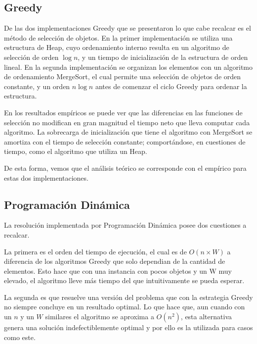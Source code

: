 \documentclass[a4paper,10pt,spanish]{article}
\begin{document}
	\subsection{Greedy}
	
	De las dos implementaciones Greedy que se presentaron lo que cabe recalcar es el m\'etodo de selecci\'on de objetos. En la primer implementaci\'on se utiliza una estructura de Heap, cuyo ordenamiento interno resulta en un algoritmo de selecci\'on de orden $\log n$, y un tiempo de inicializaci\'on de la estructura de orden lineal. En la segunda implementaci\'on se organizan los elementos con un algoritmo de ordenamiento MergeSort, el cual permite una selecci\'on de objetos de orden constante, y un orden $n\log n$ antes de comenzar el ciclo Greedy para ordenar la estructura.
	
	En los resultados emp\'iricos se puede ver que las diferencias en las funciones de selecci\'on no modifican en gran magnitud el tiempo neto que lleva computar cada algoritmo. La sobrecarga de inicializaci\'on que tiene el algoritmo con MergeSort se amortiza con el tiempo de selecci\'on constante; comport\'andose, en cuestiones de tiempo, como el algoritmo que utiliza un Heap.
	
	De esta forma, vemos que el an\'alisis te\'orico se corresponde con el emp\'irico para estas dos implementaciones. 
	
	\subsection{Programaci\'on Din\'amica}
	
	La resoluci\'on implementada por Programaci\'on Din\'amica posee dos cuestiones a recalcar.
	
	La primera es el orden del tiempo de ejecuci\'on, el cual es de $O(n\times W)$ a diferencia de los algoritmos Greedy que solo dependian de la cantidad de elementos. Esto hace que con una instancia con pocos objetos y un W muy elevado, el algoritmo lleve m\'as tiempo del que intuitivamente se pueda esperar.
	
	La segunda es que resuelve una versi\'on del problema que con la estrategia Greedy no siempre concluye en un resultado optimal. Lo que hace que, aun cuando con un $n$ y un $W$ similares el algoritmo se aproxima a $O(n^2)$, esta alternativa genera una soluci\'on indefectiblemente optimal y por ello es la utilizada para casos como este.
	
\end{document}
